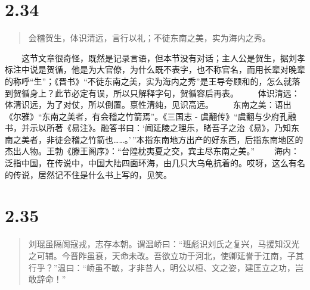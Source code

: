 \documentclass[]{book}
\begin{document}
\section{2.34}\label{section-80}

\begin{quote}
会稽贺生，体识清远，言行以礼；不徒东南之美，实为海内之秀。
\end{quote}

　　这节文章很奇怪，既然是记录言语，但本节没有对话；主人公是贺生，据刘孝标注中说是贺循，他是为大官僚，为什么既不表字，也不称官名，而用长辈对晚辈的称呼``生''；《晋书》``不徒东南之美，实为海内之秀''是王导夸顾和的，怎么就落到贺循身上？此节必定有误，所以只解释字句，贺循容后再表。
　　体识清远：体清识远，为了对仗，所以倒置。禀性清纯，见识高远。
　　东南之美：语出《尔雅》``东南之美者，有会稽之竹箭焉''。《三国志 -
虞翻传》``虞翻与少府孔融书，并示以所著《易注》。融答书曰：`闻延陵之理乐，睹吾子之治《易》，乃知东南之美者，非徒会稽之竹箭也\ldots{}\ldots{}。'\,''本指东南地方出产的好东西，后指东南地区的杰出人物。王勃《滕王阁序》：``台隍枕夷夏之交，宾主尽东南之美。''
　　海内：泛指中国，在传说中，中国大陆四面环海，由几只大乌龟抗着的。哎呀，这么有名的传说，居然记不住是什么书上写的，见笑。

\section{2.35}\label{section-81}

\begin{quote}
刘琨虽隔阂寇戎，志存本朝。谓温峤曰：``班彪识刘氏之复兴，马援知汉光之可辅。今晋阼虽衰，天命未改。吾欲立功于河北，使卿延誉于江南，子其行乎？''温曰：``峤虽不敏，才非昔人，明公以桓、文之姿，建匡立之功，岂敢辞命！''
\end{quote}
\end{document}

